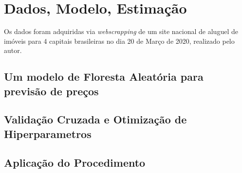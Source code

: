 

\chapter{Dados, Modelo, Estimação}

Os dados foram adquiridas via \textit{webscrapping} de um site nacional de aluguel de imóveis para 4 capitais brasileiras no dia 20 de Março de 2020, realizado pelo autor. 

\section{Um modelo de Floresta Aleatória para previsão de preços}

\section{Validação Cruzada e Otimização de Hiperparametros}

\section{Aplicação do Procedimento}
